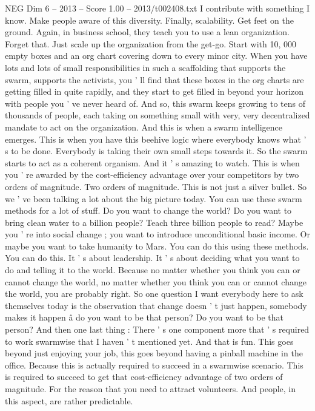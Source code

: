 \begin{textsample}{NEG Dim 6 – 2013 – Score 1.00 – 2013/t002408.txt}
I contribute with something I know.
Make people aware of this diversity.
Finally, scalability.
Get feet on the ground.
Again, in business school, they teach you to use a lean organization.
Forget that.
Just scale up the organization from the get-go.
Start with 10, 000 empty boxes and an org chart covering down to every minor city.
When you have lots and lots of small responsibilities in such a scaffolding that supports the swarm, supports the activists, you ' ll find that these boxes in the org charts are getting filled in quite rapidly, and they start to get filled in beyond your horizon with people you ' ve never heard of.
And so, this swarm keeps growing to tens of thousands of people, each taking on something small with very, very decentralized mandate to act on the organization.
And this is when a swarm intelligence emerges.
This is when you have this beehive logic where everybody knows what ' s to be done.
Everybody is taking their own small steps towards it.
So the swarm starts to act as a coherent organism.
And it ' s amazing to watch.
This is when you ' re awarded by the cost-efficiency advantage over your competitors by two orders of magnitude.
Two orders of magnitude.
This is not just a silver bullet.
So we ' ve been talking a lot about the big picture today.
You can use these swarm methods for a lot of stuff.
Do you want to change the world?
Do you want to bring clean water to a billion people?
Teach three billion people to read?
Maybe you ' re into social change ; you want to introduce unconditional basic income.
Or maybe you want to take humanity to Mars.
You can do this using these methods.
You can do this.
It ' s about leadership.
It ' s about deciding what you want to do and telling it to the world.
Because no matter whether you think you can or cannot change the world, no matter whether you think you can or cannot change the world, you are probably right.
So one question I want everybody here to ask themselves today is the observation that change doesn ' t just happen, somebody makes it happen â do you want to be that person?
Do you want to be that person?
And then one last thing : There ' s one component more that ' s required to work swarmwise that I haven ' t mentioned yet.
And that is fun.
This goes beyond just enjoying your job, this goes beyond having a pinball machine in the office.
Because this is actually required to succeed in a swarmwise scenario.
This is required to succeed to get that cost-efficiency advantage of two orders of magnitude.
For the reason that you need to attract volunteers.
And people, in this aspect, are rather predictable.

\end{textsample}
